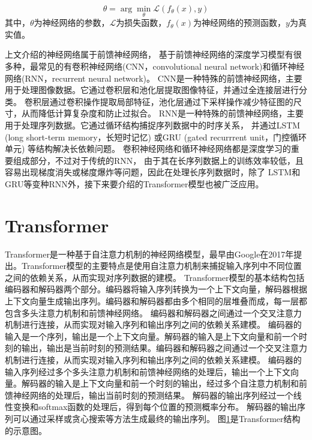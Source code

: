 \begin{equation}
  \theta = \arg\min_{\theta} \mathcal{L}(f_\theta(x), y)
\end{equation}
其中，$\theta$为神经网络的参数，$\mathcal{L}$为损失函数，$f_\theta(x)$为神经网络的预测函数，$y$为真实值。


上文介绍的神经网络属于前馈神经网络，
基于前馈神经网络的深度学习模型有很多种，最常见的有卷积神经网络(CNN，convolutional neural network)和循环神经网络(RNN，recurrent neural network)。
CNN是一种特殊的前馈神经网络，主要用于处理图像数据。它通过卷积层和池化层提取图像特征，并通过全连接层进行分类。
卷积层通过卷积操作提取局部特征，池化层通过下采样操作减少特征图的尺寸，从而降低计算复杂度和防止过拟合。
RNN是一种特殊的前馈神经网络，主要用于处理序列数据。它通过循环结构捕捉序列数据中的时序关系，
并通过LSTM (long short-term memory，长短时记忆) \cite{hochreiter1997long}
或GRU (gated recurrrent unit，门控循环单元) \cite{DBLP:journals/corr/ChoMGBSB14}等结构解决长依赖问题。
卷积神经网络和循环神经网络都是深度学习的重要组成部分，不过对于传统的RNN，
由于其在长序列数据上的训练效率较低，且容易出现梯度消失或梯度爆炸等问题，因此在处理长序列数据时，除了
LSTM和GRU等变种RNN外，接下来要介绍的Transformer模型也被广泛应用。

\section{Transformer}\label{transformer}

Transformer是一种基于自注意力机制的神经网络模型，最早由Google在2017年提出\cite{vaswani2017attention}。Transformer模型的主要特点是使用自注意力机制来捕捉输入序列中不同位置之间的依赖关系，从而实现对序列数据的建模。
Transformer模型的基本结构包括编码器和解码器两个部分。编码器将输入序列转换为一个上下文向量，解码器根据上下文向量生成输出序列。编码器和解码器都由多个相同的层堆叠而成，每一层都包含多头注意力机制和前馈神经网络。
编码器和解码器之间通过一个交叉注意力机制进行连接，从而实现对输入序列和输出序列之间的依赖关系建模。
编码器的输入是一个序列，输出是一个上下文向量。解码器的输入是上下文向量和前一个时刻的输出，输出是当前时刻的预测结果。编码器和解码器之间通过一个交叉注意力机制进行连接，从而实现对输入序列和输出序列之间的依赖关系建模。
编码器的输入序列经过多个多头注意力机制和前馈神经网络的处理后，输出一个上下文向量。解码器的输入是上下文向量和前一个时刻的输出，经过多个自注意力机制和前馈神经网络的处理后，输出当前时刻的预测结果。
解码器的输出序列经过一个线性变换和softmax函数的处理后，得到每个位置的预测概率分布。
解码器的输出序列可以通过采样或贪心搜索等方法生成最终的输出序列。
图\ref{transformer}是Transformer结构的示意图。

